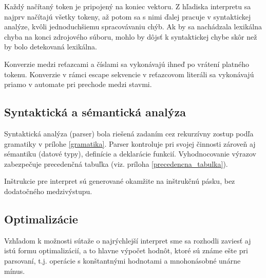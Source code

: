 \documentclass[12pt,a4paper,titlepage,final]{article}
\begin{document}
Každý načítaný token je pripojený na koniec vektoru. Z hľadiska interpretu sa
najprv načítajú všetky tokeny, až potom sa s nimi ďalej pracuje v syntaktickej
analýze, kvôli jednoduchšiemu spracovávaniu chýb. Ak by sa nachádzala
 lexikálna chyba na konci zdrojového súboru, mohlo by dôjsť k syntaktickej chybe
 skôr než by bolo detekovaná lexikálna.

Konverzie medzi reťazcami a číslami sa vykonávajú ihneď po vrátení platného tokenu.
Konverzie v rámci escape sekvencie v reťazcovom literáli sa vykonávajú
 priamo v automate pri prechode medzi stavmi.

\subsection{Syntaktická a sémantická analýza}
Syntaktická analýza (parser) bola riešená zadaním cez rekurzívny zostup 
 podľa gramatiky v prílohe \ref{gramatika}.
Parser kontroluje pri svojej činnosti zároveň aj sémantiku (datové typy),
definície a deklarácie funkcií.
Vyhodnocovanie výrazov zabezpečuje precedenčná tabuľka 
 (viz. príloha \ref{precedencna_tabulka}).

Inštrukcie pre interpret sú generované okamžite na inštrukčnú pásku,
 bez dodatočného medzivýstupu.

     
     
     
     

\subsection{Optimalizácie}
Vzhľadom k možnosti sútaže o najrýchlejší interpret sme sa rozhodli zaviesť aj
istú formu optimalizácií, a to hlavne výpočet hodnôt, ktoré sú známe ešte pri
parsovaní, t.j. operácie s konštantnými hodnotami a mnohonásobné unárne mínus.
\end{document}
